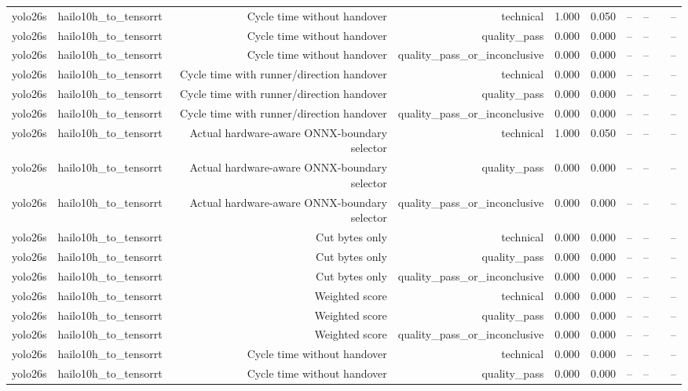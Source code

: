 \begin{table}[t]
\begin{tabular}{lrrrrrrrrr}
yolo26s & hailo10h\_to\_tensorrt & Cycle time without handover & technical & 1.000 & 0.050 & -- & -- &  & -- \\
yolo26s & hailo10h\_to\_tensorrt & Cycle time without handover & quality\_pass & 0.000 & 0.000 & -- & -- &  & -- \\
yolo26s & hailo10h\_to\_tensorrt & Cycle time without handover & quality\_pass\_or\_inconclusive & 0.000 & 0.000 & -- & -- &  & -- \\
yolo26s & hailo10h\_to\_tensorrt & Cycle time with runner/direction handover & technical & 0.000 & 0.000 & -- & -- &  & -- \\
yolo26s & hailo10h\_to\_tensorrt & Cycle time with runner/direction handover & quality\_pass & 0.000 & 0.000 & -- & -- &  & -- \\
yolo26s & hailo10h\_to\_tensorrt & Cycle time with runner/direction handover & quality\_pass\_or\_inconclusive & 0.000 & 0.000 & -- & -- &  & -- \\
yolo26s & hailo10h\_to\_tensorrt & Actual hardware-aware ONNX-boundary selector & technical & 1.000 & 0.050 & -- & -- &  & -- \\
yolo26s & hailo10h\_to\_tensorrt & Actual hardware-aware ONNX-boundary selector & quality\_pass & 0.000 & 0.000 & -- & -- &  & -- \\
yolo26s & hailo10h\_to\_tensorrt & Actual hardware-aware ONNX-boundary selector & quality\_pass\_or\_inconclusive & 0.000 & 0.000 & -- & -- &  & -- \\
yolo26s & hailo10h\_to\_tensorrt & Cut bytes only & technical & 0.000 & 0.000 & -- & -- &  & -- \\
yolo26s & hailo10h\_to\_tensorrt & Cut bytes only & quality\_pass & 0.000 & 0.000 & -- & -- &  & -- \\
yolo26s & hailo10h\_to\_tensorrt & Cut bytes only & quality\_pass\_or\_inconclusive & 0.000 & 0.000 & -- & -- &  & -- \\
yolo26s & hailo10h\_to\_tensorrt & Weighted score & technical & 0.000 & 0.000 & -- & -- &  & -- \\
yolo26s & hailo10h\_to\_tensorrt & Weighted score & quality\_pass & 0.000 & 0.000 & -- & -- &  & -- \\
yolo26s & hailo10h\_to\_tensorrt & Weighted score & quality\_pass\_or\_inconclusive & 0.000 & 0.000 & -- & -- &  & -- \\
yolo26s & hailo10h\_to\_tensorrt & Cycle time without handover & technical & 0.000 & 0.000 & -- & -- &  & -- \\
yolo26s & hailo10h\_to\_tensorrt & Cycle time without handover & quality\_pass & 0.000 & 0.000 & -- & -- &  & -- \\

\end{tabular}
\end{table}
